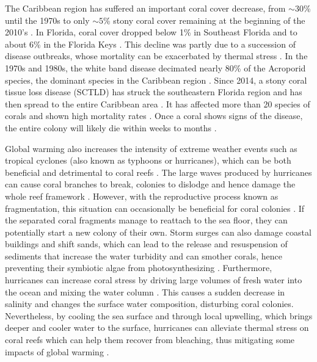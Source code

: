 \documentclass[fleqn,10pt]{wlscirep}
\begin{document}
The Caribbean region has suffered an important coral cover decrease, from $\sim30$\% until the 1970s to only $\sim5$\% stony coral cover remaining at the beginning of the 2010's  \citep{Porter1992Dec,Ruzicka2013Aug}. In Florida, coral cover dropped below 1\% in Southeast Florida and to about 6\% in the Florida Keys \cite{grove2022national}. This decline was partly due to a succession of disease outbreaks, whose mortality can be exacerbated by thermal stress \citep{muller2012caribbean,muller2018bleaching}. In the 1970s and 1980s, the white band disease decimated nearly 80\% of the Acroporid species, the dominant species in the Caribbean region \citep{Kline2011,Aronson2001Sep}. Since 2014, a stony coral tissue loss disease (SCTLD) has struck the southeastern Florida region and has then spread to the entire Caribbean area \citep{Precht2016Aug}. It has affected more than 20 species of corals and shown high mortality rates \citep{Alvarez-Filip2022Jun}. Once a coral shows signs of the disease, the entire  colony will likely die within weeks to months \citep{NOAA2020Nov}.

Global warming also increases the intensity of extreme weather events such as tropical cyclones (also known as typhoons or hurricanes), which can be both beneficial and detrimental to coral reefs \citep{Bhatia2019Feb, Knutson2020Mar}. The large waves produced by hurricanes can cause coral branches to break, colonies to dislodge and hence damage the whole reef framework \citep{Scoffin1993Nov, Carter2022}. However, with the reproductive process known as fragmentation, this situation can occasionally be beneficial for coral colonies \citep{Bonin2011Jul}. If the separated coral fragments manage to reattach to the sea floor, they can potentially start a new colony of their own. Storm surges can also damage coastal buildings and shift sands, which can lead to the release and resuspension of sediments that increase the water turbidity and can smother corals, hence preventing their symbiotic algae from photosynthesizing \citep{Erftemeijer2012Sep, Jones2015Nov}. Furthermore, hurricanes can increase coral stress by driving large volumes of fresh water into the ocean and mixing the water column \citep{Allahdadi2017Apr}. This causes a sudden decrease in salinity and changes the surface water composition, disturbing coral colonies. Nevertheless, by cooling the sea surface and through local upwelling, which brings deeper and cooler water to the surface, hurricanes can alleviate thermal stress on coral reefs which can help them recover from bleaching, thus mitigating some impacts of global warming \citep{Aijaz2017May, Varlas2020Jul, Manzello2007Jul}.
\end{document}

